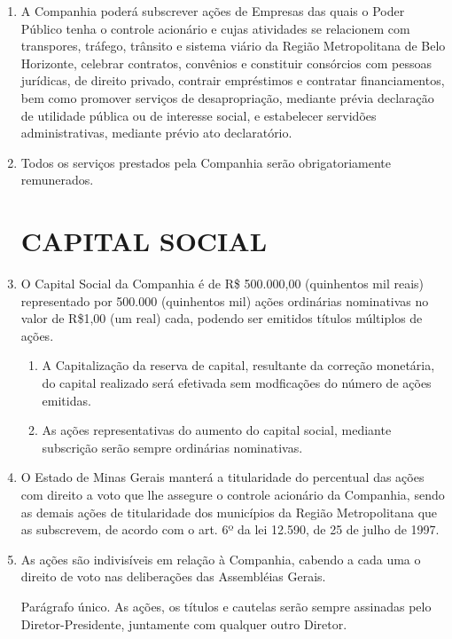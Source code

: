 \documentclass[a4paper,11pt]{report}
\begin{document}
\begin{enumerate}[resume, label=Art. \arabic*]
\item A Companhia poderá subscrever ações de Empresas das quais o Poder Público tenha o controle acionário e cujas atividades se relacionem com transpores, tráfego, trânsito e sistema viário da Região Metropolitana de Belo Horizonte, celebrar contratos, convênios e constituir consórcios com pessoas jurídicas, de direito privado, contrair empréstimos e contratar financiamentos, bem como promover serviços de desapropriação, mediante prévia declaração de utilidade pública ou de interesse social, e estabelecer servidões administrativas, mediante prévio ato declaratório.

\item Todos os serviços prestados pela Companhia serão obrigatoriamente remunerados.

\chapter{CAPITAL SOCIAL}

\item O Capital Social da Companhia é de R\$ 500.000,00 (quinhentos mil reais) representado por 500.000 (quinhentos mil) ações ordinárias nominativas no valor de R\$1,00 (um real) cada, podendo ser emitidos títulos múltiplos de ações.

\begin{enumerate}[label= \S \arabic*]
    \item A Capitalização da reserva de capital, resultante da correção monetária, do capital realizado será efetivada sem modficações do número de ações emitidas.
    \item As ações representativas do aumento do capital social, mediante subscrição serão sempre ordinárias nominativas.
\end{enumerate}

\item O Estado de Minas Gerais manterá a titularidade do percentual das ações com direito a voto que lhe assegure o controle acionário da Companhia, sendo as demais ações de titularidade dos municípios da Região Metropolitana que as subscrevem, de acordo com o art. 6º da lei 12.590, de 25 de julho de 1997.

\item As ações são indivisíveis em relação à Companhia, cabendo a cada uma o direito de voto nas deliberações das Assembléias Gerais.

Parágrafo único. As ações, os títulos e cautelas serão sempre assinadas pelo Diretor-Presidente, juntamente com qualquer outro Diretor.


\end{enumerate}
\end{document}
